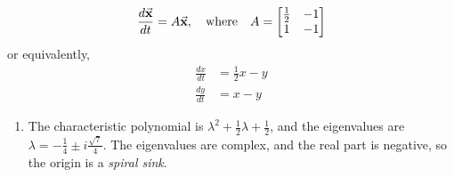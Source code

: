 \begin{xexample}
\[
  \frac{d\vec{\textbf{x}}}{dt} = A \vec{\textbf{x}}, \quad \textrm{where} \quad
    A = \begin{bmatrix}
                   \frac{1}{2} & -1 \\
		   1 & -1 \\
        \end{bmatrix}
\]
or equivalently,
\[
\begin{split}
   \frac{dx}{dt} & = \frac{1}{2} x - y \\
   \frac{dy}{dt} & = x - y
\end{split}
\]
\begin{enumerate}
\item
The characteristic polynomial is $\lambda^2 +\frac{1}{2}\lambda+\frac{1}{2}$,
and the eigenvalues are
$\lambda = -\frac{1}{4}\pm i \frac{\sqrt{7}}{4}$.
The eigenvalues are complex,
and the real part is negative,
so the origin is a \emph{spiral sink}.


\end{enumerate}
\end{xexample}
